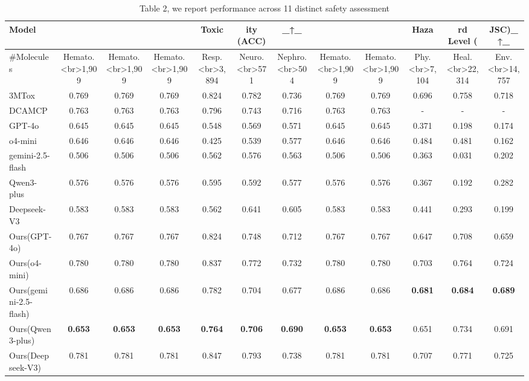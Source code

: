 \begin{table}[t]
\centering
\caption{Table 2, we report performance across 11 distinct safety assessment}
\label{tab:2607.00464}
\begin{tabular}{lccccccccccc}
\toprule
Model &  &  &  & Toxic & ity (ACC) & \_↑\_ &  &  & Haza & rd Level ( & JSC)\_↑\_ \\
\midrule
\#Molecules & Hemato.<br>1,909 & Hemato.<br>1,909 & Hemato.<br>1,909 & Resp.<br>3,894 & Neuro.<br>571 & Nephro.<br>504 & Hemato.<br>1,909 & Hemato.<br>1,909 & Phy.<br>7,104 & Heal.<br>22,314 & Env.<br>14,757 \\
3MTox & 0.769 & 0.769 & 0.769 & 0.824 & 0.782 & 0.736 & 0.769 & 0.769 & 0.696 & 0.758 & 0.718 \\
DCAMCP & 0.763 & 0.763 & 0.763 & 0.796 & 0.743 & 0.716 & 0.763 & 0.763 & - & - & - \\
GPT-4o & 0.645 & 0.645 & 0.645 & 0.548 & 0.569 & 0.571 & 0.645 & 0.645 & 0.371 & 0.198 & 0.174 \\
o4-mini & 0.646 & 0.646 & 0.646 & 0.425 & 0.539 & 0.577 & 0.646 & 0.646 & 0.484 & 0.481 & 0.162 \\
gemini-2.5-flash & 0.506 & 0.506 & 0.506 & 0.562 & 0.576 & 0.563 & 0.506 & 0.506 & 0.363 & 0.031 & 0.202 \\
Qwen3-plus & 0.576 & 0.576 & 0.576 & 0.595 & 0.592 & 0.577 & 0.576 & 0.576 & 0.367 & 0.192 & 0.282 \\
Deepseek-V3 & 0.583 & 0.583 & 0.583 & 0.562 & 0.641 & 0.605 & 0.583 & 0.583 & 0.441 & 0.293 & 0.199 \\
Ours(GPT-4o) & 0.767 & 0.767 & 0.767 & 0.824 & 0.748 & 0.712 & 0.767 & 0.767 & 0.647 & 0.708 & 0.659 \\
Ours(o4-mini) & 0.780 & 0.780 & 0.780 & 0.837 & 0.772 & 0.732 & 0.780 & 0.780 & 0.703 & 0.764 & 0.724 \\
Ours(gemini-2.5-flash) & 0.686 & 0.686 & 0.686 & 0.782 & 0.704 & 0.677 & 0.686 & 0.686 & \textbf{0.681} & \textbf{0.684} & \textbf{0.689} \\
Ours(Qwen3-plus) & \textbf{0.653} & \textbf{0.653} & \textbf{0.653} & \textbf{0.764} & \textbf{0.706} & \textbf{0.690} & \textbf{0.653} & \textbf{0.653} & 0.651 & 0.734 & 0.691 \\
Ours(Deepseek-V3) & 0.781 & 0.781 & 0.781 & 0.847 & 0.793 & 0.738 & 0.781 & 0.781 & 0.707 & 0.771 & 0.725 \\
\bottomrule
\end{tabular}
\end{table}
